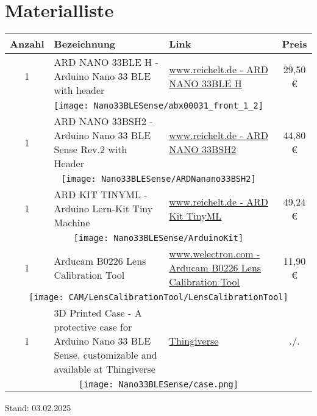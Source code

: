 %
%


\chapter{Materialliste}



	\begin{longtable}{cp{6.1cm}p{2.5cm}c}
      \textbf{Anzahl} & \textbf{Bezeichnung} & \textbf{Link} & \textbf{Preis} \\ \hline   
       1      & ARD NANO 33BLE H - Arduino Nano 33 BLE with header
              & \href{https://www.reichelt.com/de/en/shop/product/arduino_nano_33_ble_nrf52840_with_header-261305}{www.reichelt.de -  ARD NANO 33BLE H} 
              &  29{,}50 \euro{} \\
              \multicolumn{4}{c}{\texttt{[image: Nano33BLESense/abx00031\_front\_1\_2]}} \\  \hline 
       1      & ARD NANO 33BSH2 - Arduino Nano 33 BLE Sense Rev.2  with Header
              & \href{https://www.reichelt.com/de/en/shop/product/arduino_nano_33_ble_sense_rev_2_nrf52840_with_header-336865}{www.reichelt.de -  ARD NANO 33BSH2} 
              &  44{,}80 \euro{} \\ 
      \multicolumn{4}{c}{\texttt{[image: Nano33BLESense/ARDNanano33BSH2]}} \\ \hline 
      1      & ARD KIT TINYML -  Arduino Lern-Kit Tiny Machine
             & \href{https://www.reichelt.de/arduino-lern-kit-tiny-machine-ard-kit-tinyml-p304338.html}{www.reichelt.de -  ARD Kit TinyML } 
             &  49{,}24 \euro{} \\ 
      \multicolumn{4}{c}{\texttt{[image: Nano33BLESense/ArduinoKit]}} \\ \hline 
      1      & Arducam B0226 Lens Calibration Tool
& \href{https://www.welectron.com/Arducam-B0226-Lens-Calibration-Tool}{www.welectron.com -  Arducam B0226 Lens Calibration Tool } 
&  11{,}90 \euro{} \\ 
      \multicolumn{4}{c}{\texttt{[image: CAM/LensCalibrationTool/LensCalibrationTool]}} \\ \hline
	1 & 3D Printed Case - A protective case for Arduino Nano 33 BLE Sense, customizable and available at Thingiverse &  \href{https://www.thingiverse.com/thing:4801467/files#google_vignette}{Thingiverse} & ./. \\
\multicolumn{4}{c}{\texttt{[image: Nano33BLESense/case.png]}} \\ \hline
    \end{longtable}

Stand: 03.02.2025



